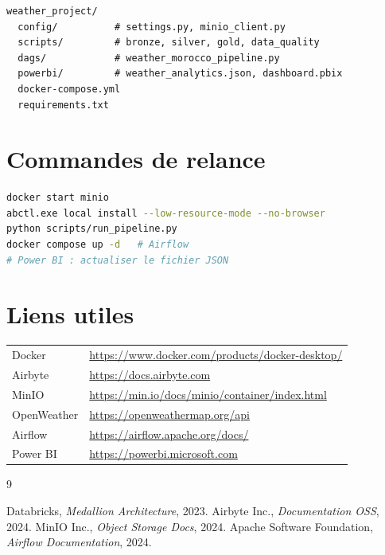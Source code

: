\documentclass[12pt,a4paper]{report}
\begin{document}
\begin{lstlisting}
weather_project/
  config/          # settings.py, minio_client.py
  scripts/         # bronze, silver, gold, data_quality
  dags/            # weather_morocco_pipeline.py
  powerbi/         # weather_analytics.json, dashboard.pbix
  docker-compose.yml
  requirements.txt
\end{lstlisting}

\chapter{Commandes de relance}

\begin{lstlisting}[language=bash]
docker start minio
abctl.exe local install --low-resource-mode --no-browser
python scripts/run_pipeline.py
docker compose up -d   # Airflow
# Power BI : actualiser le fichier JSON
\end{lstlisting}

\chapter{Liens utiles}

\begin{tabular}{@{}p{4cm}p{10cm}@{}}
Docker & \url{https://www.docker.com/products/docker-desktop/} \\
Airbyte & \url{https://docs.airbyte.com} \\
MinIO & \url{https://min.io/docs/minio/container/index.html} \\
OpenWeather & \url{https://openweathermap.org/api} \\
Airflow & \url{https://airflow.apache.org/docs/} \\
Power BI & \url{https://powerbi.microsoft.com} \\
\end{tabular}

\begin{thebibliography}{9}
 Databricks, \textit{Medallion Architecture}, 2023.
 Airbyte Inc., \textit{Documentation OSS}, 2024.
 MinIO Inc., \textit{Object Storage Docs}, 2024.
 Apache Software Foundation, \textit{Airflow Documentation}, 2024.
\end{thebibliography}
\end{document}
